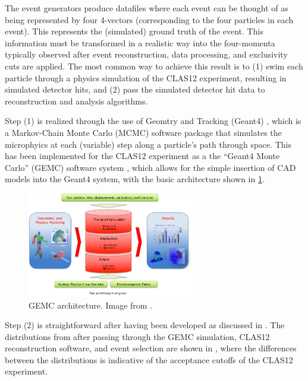 The event generators produce datafiles where each event can be thought of as being represented by four 4-vectors (corresponding to the four particles in each event). This represents the (simulated) ground truth of the event. This information must be transformed in a realistic way into the four-momenta typically observed after event reconstruction, data processing, and exclusivity cuts are applied. The most common way to achieve this result is to (1) swim each particle through a physics simulation of the CLAS12 experiment, resulting in simulated detector hits, and (2) pass the simulated detector hit data to reconstruction and analysis algorithms. 

Step (1) is realized through the use of Geomtry and Tracking (Geant4) \parencite{Agostinelli2003Geant4aToolkit}, which is a Markov-Chain Monte Carlo (MCMC) software package that simulates the microphyics at each (variable) step along a particle's path through space. This has been implemented for the CLAS12 experiment as a the ``Geant4 Monte Carlo'' (GEMC) software system \parencite{Ungaro2020TheSimulation}, which allows for the simple insertion of CAD models into the Geant4 system, with the basic architecture shown in \ref{fig:gemc_architecture}. 

\begin{figure}[htb]
    \centering
    \includegraphics[width=0.65\textwidth]{Chapters/Ch3-Simulations/simulation_pipeline/pics/gemc_basics.png}
    \caption[GEMC Architecture]{GEMC architecture. Image from \parencite{Ungaro2020TheSimulation}.}
    \label{fig:gemc_architecture}
\end{figure}

Step (2) is straightforward after having been developed as discussed in . The distributions from  after passing through the GEMC simulation, CLAS12 reconstruction software, and event selection are shown in , where the differences between the distributions is indicative of the acceptance cutoffs of the CLAS12 experiment. 


